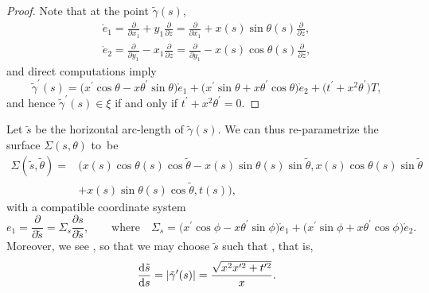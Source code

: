 \documentclass[pdftex]{sigma}
\numberwithin{equation}{section}
\begin{document}
\begin{proof}
Note that at the point $\tilde{\gamma}(s)$,
\begin{gather*}
\mathring e_1=\frac{\partial}{\partial x_1}+y_1\frac{\partial}{\partial z}=
\frac{\partial}{\partial x_1}+x(s)\sin \theta(s)\frac{\partial}{\partial z},
\\
\mathring e_2=\frac{\partial}{\partial y_1}-x_1\frac{\partial}{\partial z}=
\frac{\partial}{\partial y_1}-x(s)\cos \theta(s)\frac{\partial}{\partial z},
\end{gather*}
and direct computations imply
\begin{equation*}
\tilde{\gamma}^{\prime }(s)=\big(x^{\prime }\cos \theta-x\theta^{\prime }\sin
\theta\big)\mathring e_1+\big(x^{\prime }\sin \theta+x\theta^{\prime }\cos
\theta\big)\mathring e_2+\big(t^{\prime}+x^{2}\theta^{\prime}\big)T,
\end{equation*}
and hence $\tilde{\gamma}^{\prime }(s)\in \xi$ if and only if $t^{\prime}+x^{2}\theta^{\prime}=0$.
\end{proof}

Let $\tilde{s}$ be the horizontal arc-length of $\tilde{\gamma}(s)$. We can thus re-parametrize the surface $\Sigma(s,\theta)$ to~be
\begin{align*} %
\Sigma(\tilde s,\tilde \theta)={}&\bigl(x(s)\cos \theta(s)\cos \tilde
\theta-x(s)\sin \theta(s)\sin \tilde \theta,x(s)\cos \theta(s)\sin \tilde
\theta\\
&+x(s)\sin \theta(s)\cos \tilde \theta,t(s)\bigr),
\end{align*}
with a compatible coordinate system
\[
e_1=\frac{\partial}{\partial \tilde s}=\Sigma_s\frac{\partial s}{\partial
\tilde s}, \qquad \text{where} \quad \Sigma_s=\bigl(x^{\prime }\cos
\phi-x\theta^{\prime }\sin \phi\bigr)\mathring e_1+
\bigl(x^{\prime }\sin \phi+x\theta^{\prime }\cos \phi\bigr)\mathring e_2.
\]
Moreover, we see
,
so that we may choose $\tilde s$ such that , that is,
\begin{equation}\label{excss}
\frac{{\rm d}\tilde s}{{\rm d}s}=|\tilde{\gamma}^{\prime }(s)|=\frac{\sqrt{x^2x^{\prime 2}+t^{\prime 2}}}{x}.
\end{equation}
\end{document}
